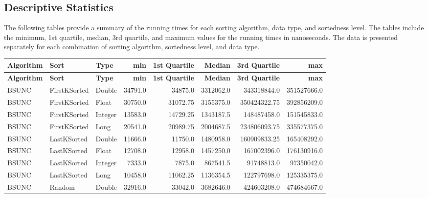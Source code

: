 \documentclass[unicode,11pt,a4paper,oneside,numbers=endperiod,openany]{scrartcl}
\begin{document}
    \subsection{Descriptive Statistics}

    The following tables provide a summary of the running times for each sorting algorithm, data type, and sortedness level. The tables include the minimum, 1st quartile, median, 3rd quartile, and maximum values for the running times in nanoseconds. The data is presented separately for each combination of sorting algorithm, sortedness level, and data type.\\

    \begin{center}
        \footnotesize
        \begin{longtable}{|l|l|l|r|r|r|r|r|}
            \hline
            \textbf{Algorithm} & \textbf{Sort} & \textbf{Type} & \textbf{min} & \textbf{1st Quartile} & \textbf{Median} & \textbf{3rd Quartile} & \textbf{max} \\
            \hline
            \endfirsthead
            \hline
            \textbf{Algorithm} & \textbf{Sort} & \textbf{Type} & \textbf{min} & \textbf{1st Quartile} & \textbf{Median} & \textbf{3rd Quartile} & \textbf{max} \\
            \hline
            \endhead
            \hline
            \endfoot
            BSUNC & FirstKSorted & Double & 34791.0 & 34875.0 & 3312062.0 & 343318844.0 & 351527666.0 \\
            BSUNC & FirstKSorted & Float & 30750.0 & 31072.75 & 3155375.0 & 350424322.75 & 392856209.0 \\
            BSUNC & FirstKSorted & Integer & 13583.0 & 14729.25 & 1343187.5 & 148487458.0 & 151545833.0 \\
            BSUNC & FirstKSorted & Long & 20541.0 & 20989.75 & 2004687.5 & 234806093.75 & 335577375.0 \\
            BSUNC & LastKSorted & Double & 11666.0 & 11750.0 & 1480958.0 & 160909833.25 & 165408292.0 \\
            BSUNC & LastKSorted & Float & 12708.0 & 12958.0 & 1457250.0 & 167002396.0 & 176130916.0 \\
            BSUNC & LastKSorted & Integer & 7333.0 & 7875.0 & 867541.5 & 91748813.0 & 97350042.0 \\
            BSUNC & LastKSorted & Long & 10458.0 & 11062.25 & 1136354.5 & 122797698.0 & 125335375.0 \\
            BSUNC & Random & Double & 32916.0 & 33042.0 & 3682646.0 & 424603208.0 & 474684667.0 \\

\end{longtable}
\end{center}
\end{document}
